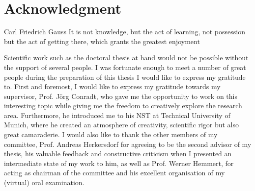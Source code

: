 \chapter*{Acknowledgment}
\begin{chapquote}{Carl Friedrich Gauss}
It is not knowledge, but the act of learning, not possession but the act of getting there, which grants the greatest enjoyment
\end{chapquote}

Scientific work such as the doctoral thesis at hand would not be possible without the support of several people.
I was fortunate enough to meet a number of great people during the preparation of this thesis I would like to express my gratitude to.
First and foremost, I would like to express my gratitude towards  my supervisor, Prof. J\"org Conradt, who gave me the opportunity to work on this interesting topic while giving me the freedom to creatively explore the research area.
Furthermore, he introduced me to his \acl{NST} at Technical University of Munich, where he created an atmosphere of creativity, scientific rigor but also great camaraderie.
I would also like to thank the other members of my committee, Prof. Andreas Herkersdorf for agreeing to be the second advisor of my thesis, his valuable feedback and constructive criticism when I presented an intermediate state of my work to him, as well as Prof. Werner Hemmert, for acting as chairman of the committee and his excellent organisation of my (virtual) oral examination.

